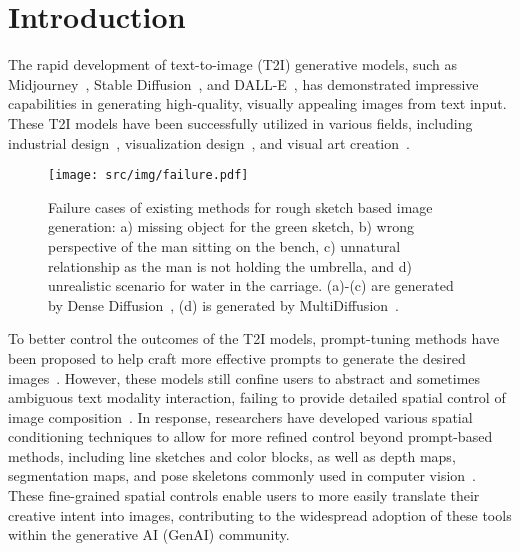 \section{Introduction}\label{sec:introduction}
The rapid development of text-to-image (T2I) generative models, such as Midjourney~\cite{MID}, Stable Diffusion~\cite{rombach2022high}, and DALL-E~\cite{ramesh2022hierarchical}, has demonstrated impressive capabilities in generating high-quality, visually appealing images from text input.
These T2I models have been successfully utilized in various fields, including industrial design~\cite{liu20233dall}, visualization design~\cite{xiao2023let}, and visual art creation~\cite{ko2023large}.

\begin{figure*}[t]
    \centering
    \texttt{[image: src/img/failure.pdf]}
    \vspace{-1mm}
    \caption{Failure cases of existing methods for rough sketch based image generation: a) missing object for the green sketch, b) wrong perspective of the man sitting on the bench, c) unnatural relationship as the man is not holding the umbrella, and d) unrealistic scenario for water in the carriage. (a)-(c) are generated by Dense Diffusion~\cite{kim2023dense}, (d) is generated by MultiDiffusion~\cite{bar2023multidiffusion}.}
    \label{fig:problem_identify}
    \vspace{0mm}
\end{figure*}

To better control the outcomes of the T2I models, prompt-tuning methods have been proposed to help craft more effective prompts to generate the desired images~\cite{guo2024prompthis,wang2024promptcharm,feng2023promptmagician}. 
However, these models still confine users to abstract and sometimes ambiguous text modality interaction, failing to provide detailed spatial control of image composition~\cite{zhang2023adding}.
In response, researchers have developed various spatial conditioning techniques to allow for more refined control beyond prompt-based methods, including line sketches and color blocks, as well as depth maps, segmentation maps, and pose skeletons commonly used in computer vision~\cite{zhang2023adding,mou2024t2i,koley2023picture, kodaira2023streamdiffusion,lee2024streammultidiffusion}. 
These fine-grained spatial controls enable users to more easily translate their creative intent into images, contributing to the widespread adoption of these tools within the generative AI (GenAI) community.


